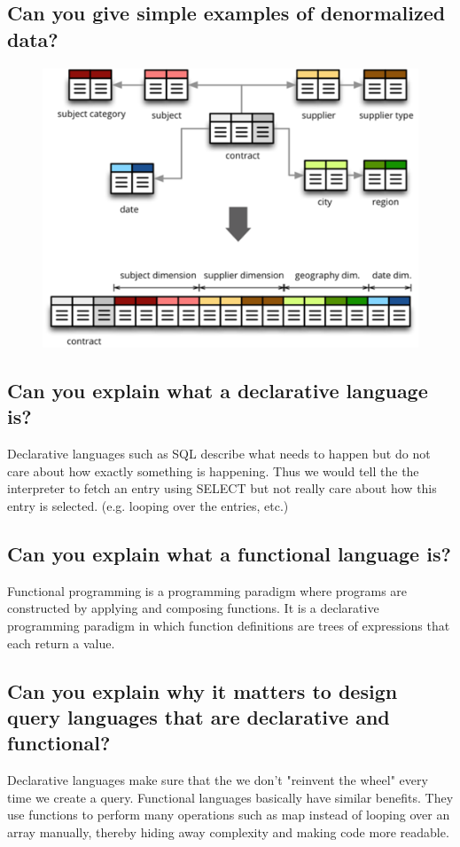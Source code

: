 \documentclass{article}
\begin{document}
\subsection{Can you give simple examples of denormalized data?}

\begin{figure}[H]
    \centering
    \includegraphics[width=0.3\linewidth]{img/denormalization.png}
\end{figure}

\subsection{Can you explain what a declarative language is?}

Declarative languages such as SQL describe what needs to happen but do not care about how exactly something is happening. Thus we would tell the the interpreter to fetch an entry using SELECT but not really care about how this entry is selected. (e.g. looping over the entries, etc.)

\subsection{Can you explain what a functional language is?}

Functional programming is a programming paradigm where programs are constructed by applying and composing functions. It is a declarative programming paradigm in which function definitions are trees of expressions that each return a value.

\subsection{Can you explain why it matters to design query languages that are declarative and functional?}

Declarative languages make sure that the we don't "reinvent the wheel" every time we create a query. Functional languages basically have similar benefits. They use functions to perform many operations such as map instead of looping over an array manually, thereby hiding away complexity and making code more readable.
\end{document}
